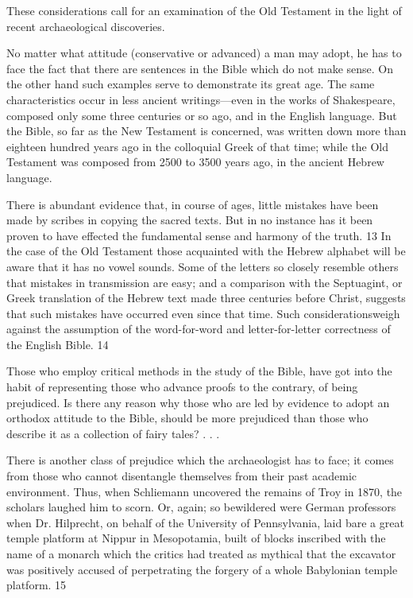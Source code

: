 These considerations call for an examination of the Old Testament in the light of recent
archaeological discoveries.

No matter what attitude (conservative or advanced) a man may adopt, he has to face the fact
that there are sentences in the Bible which do not make sense. On the other hand such
examples serve to demonstrate its great age. The same characteristics occur in less ancient
writings—even in the works of Shakespeare, composed only some three centuries or so ago,
and in the English language. But the Bible, so far as the New Testament is concerned, was
written down more than eighteen hundred years ago in the colloquial Greek of that time;
while the Old Testament was composed from 2500 to 3500 years ago, in the ancient Hebrew
language.

There is abundant evidence that, in course of ages, little mistakes have been made by scribes
in copying the sacred texts. But in no instance has it been proven to have effected the
fundamental sense and harmony of the truth. 13 In the case of the Old Testament those
acquainted with the Hebrew alphabet will be aware that it has no vowel sounds. Some of the
letters so closely resemble others that mistakes in transmission are easy; and a comparison
with the Septuagint, or Greek translation of the Hebrew text made three centuries before
Christ, suggests that such mistakes have occurred even since that time. Such considerationsweigh against the assumption of the word-for-word and letter-for-letter correctness of the
English Bible. 14

Those who employ critical methods in the study of the Bible, have got into the habit of
representing those who advance proofs to the contrary, of being prejudiced. Is there any
reason why those who are led by evidence to adopt an orthodox attitude to the Bible, should
be more prejudiced than those who describe it as a collection of fairy tales? . . .

There is another class of prejudice which the archaeologist has to face; it comes from those
who cannot disentangle themselves from their past academic environment. Thus, when
Schliemann uncovered the remains of Troy in 1870, the scholars laughed him to scorn. Or,
again; so bewildered were German professors when Dr. Hilprecht, on behalf of the
University of Pennsylvania, laid bare a great temple platform at Nippur in Mesopotamia,
built of blocks inscribed with the name of a monarch which the critics had treated as mythical
that the excavator was positively accused of perpetrating the forgery of a whole Babylonian
temple platform. 15


